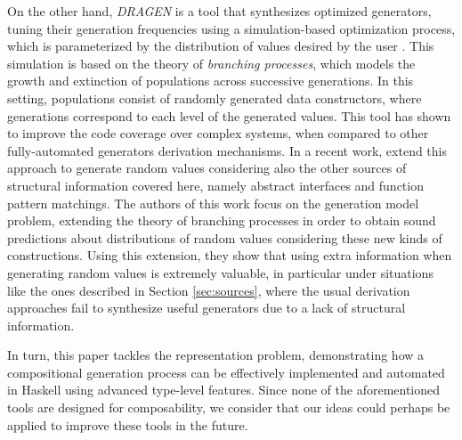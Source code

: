 On the other hand, \emph{DRAGEN} is a tool that synthesizes optimized
generators, tuning their generation frequencies using a simulation-based
optimization process, which is parameterized by the distribution of values
desired by the user \cite{DBLP:conf/haskell/MistaRH18}.
%
This simulation is based on the theory of \emph{branching processes}, which
models the growth and extinction of populations across successive generations.
%
In this setting, populations consist of randomly generated data constructors,
where generations correspond to each level of the generated values.
%
This tool has shown to improve the code coverage over complex systems, when
compared to other fully-automated generators derivation mechanisms.
%
In a recent work, \citeauthor{Mista2019GeneratingRS} extend this approach to
generate random values considering also the other sources of structural
information covered here, namely abstract interfaces and function pattern
matchings.
%
The authors of this work focus on the generation model problem, extending the
theory of branching processes in order to obtain sound predictions about
distributions of random values considering these new kinds of constructions.
%
Using this extension, they show that using extra information when generating
random values is extremely valuable, in particular under situations like the
ones described in Section \ref{sec:sources}, where the usual derivation
approaches fail to synthesize useful generators due to a lack of structural
information.


In turn, this paper tackles the representation problem, demonstrating how a
compositional generation process can be effectively implemented and automated in
Haskell using advanced type-level features.
%
Since none of the aforementioned tools are designed for composability, we
consider that our ideas could perhaps be applied to improve these tools in the
future.
